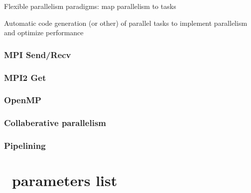 \documentclass{book}
\begin{document}
Flexible parallelism paradigms: map parallelism to tasks

Automatic code generation (or other) of parallel tasks to implement
parallelism and optimize performance

\subsection{MPI Send/Recv}

\subsection{MPI2 Get}

\subsection{OpenMP}

\subsection{Collaberative parallelism}

\subsection{Pipelining}

\appendix
\newcommand{\parametersize}{\scriptsize}

\chapter{\enzo\ parameters list}
\end{document}

